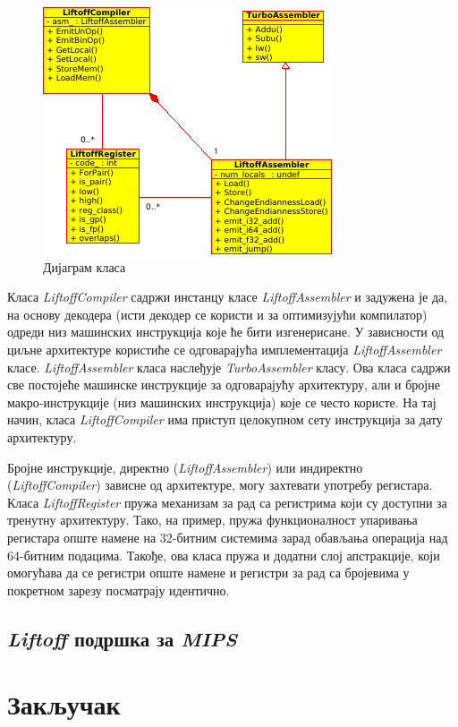\documentclass[12pt,oneside]{memoir}
\begin{document}
\begin{figure}
\begin{center}
\includegraphics[scale=0.8]{class_diagram}
\caption{Дијаграм класа}
\label{img:LiftoffDiag}
\end{center}
\end{figure}

Класа \textit{LiftoffCompiler} садржи инстанцу класе \textit{LiftoffAssembler} и задужена је да, на основу декодера (исти декодер се користи и за оптимизујући компилатор) одреди низ машинских инструкција
које ће бити изгенерисане. У зависности од циљне архитектуре користиће се одговарајућа имплементација \textit{LiftoffAssembler} класе. \textit{LiftoffAssembler} класа наслеђује \textit{TurboAssembler} класу.
Ова класа садржи све постојеће машинске инструкције за одговарајућу архитектуру, али и бројне макро-инструкције (низ машинских инструкција) које се често користе. На тај начин, класа \textit{LiftoffCompiler}
има приступ целокупном сету инструкција за дату архитектуру.

Бројне инструкције, директно (\textit{LiftoffAssembler}) или индиректно (\textit{LiftoffCompiler}) зависне од архитектуре, могу захтевати употребу регистара. Класа \textit{LiftoffRegister} пружа механизам за рад са регистрима који су доступни за тренутну архитектуру.
Тако, на пример, пружа функционалност упаривања регистара опште намене на 32-битним системима зарад обављања операција над 64-битним подацима. Такође, ова класа пружа и додатни слој апстракције, који омогућава
да се регистри опште намене и регистри за рад са бројевима у покретном зарезу посматрају идентично.

\section{\textit{Liftoff} подршка за \textit{MIPS}} \label{chp:LIFTOFFMIPS}

\chapter*{Закључак}

\literatura

\backmatter
\end{document}
